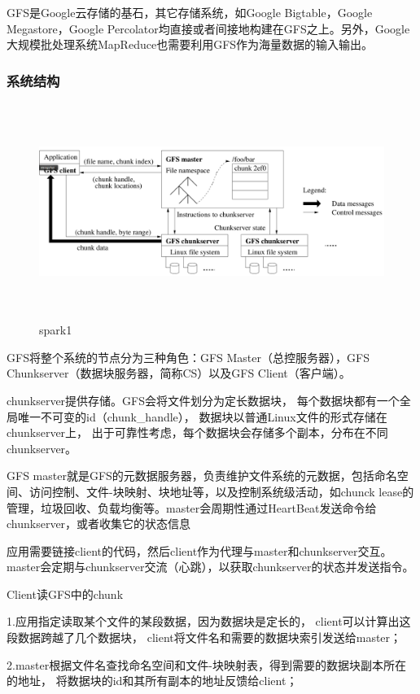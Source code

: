 GFS是Google云存储的基石，其它存储系统，如Google Bigtable，Google Megastore，Google Percolator均直接或者间接地构建在GFS之上。另外，Google大规模批处理系统MapReduce也需要利用GFS作为海量数据的输入输出。

\subsubsection{系统结构}
\begin{figure}[!h]
    \centering
    \includegraphics[height=7cm,width= 15cm]{img/gfs.png}
    \caption{spark1}
\label{spark1}
\end{figure}

GFS将整个系统的节点分为三种角色：GFS Master（总控服务器），GFS Chunkserver（数据块服务器，简称CS）以及GFS Client（客户端）。

chunkserver提供存储。GFS会将文件划分为定长数据块，
每个数据块都有一个全局唯一不可变的id（chunk\_handle），
数据块以普通Linux文件的形式存储在chunkserver上，
出于可靠性考虑，每个数据块会存储多个副本，分布在不同chunkserver。

GFS master就是GFS的元数据服务器，负责维护文件系统的元数据，包括命名空间、访问控制、文件-块映射、块地址等，以及控制系统级活动，如chunck lease的管理，垃圾回收、负载均衡等。master会周期性通过HeartBeat发送命令给chunkserver，或者收集它的状态信息

应用需要链接client的代码，然后client作为代理与master和chunkserver交互。master会定期与chunkserver交流（心跳），以获取chunkserver的状态并发送指令。


Client读GFS中的chunk

1.应用指定读取某个文件的某段数据，因为数据块是定长的，
client可以计算出这段数据跨越了几个数据块，
client将文件名和需要的数据块索引发送给master；

2.master根据文件名查找命名空间和文件-块映射表，得到需要的数据块副本所在的地址，
将数据块的id和其所有副本的地址反馈给client；

